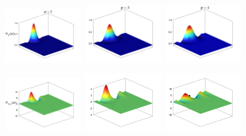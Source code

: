 \begin{figure}[H]
    \centering
    \begin{subcaptiongroup}
    \includegraphics[width=0.3\textwidth]{figure/nomesh/QD77/1.png}
    \includegraphics[width=0.3\textwidth]{figure/nomesh/C77/1.png}
    \includegraphics[width=0.3\textwidth]{figure/nomesh/QT77/1.png}
    \end{subcaptiongroup}
     \begin{subcaptiongroup}
    \includegraphics[width=0.3\textwidth]{figure/nomesh/QD77/2.png}
    \includegraphics[width=0.3\textwidth]{figure/nomesh/C77/2.png}
    \includegraphics[width=0.3\textwidth]{figure/nomesh/QT77/2.png}

\end{subcaptiongroup}
\end{figure}
